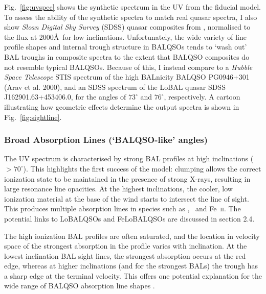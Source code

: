 \noindent
Fig.~\ref{fig:uvspec} shows the synthetic spectrum in the UV from the fiducial model. 
To assess the ability of the synthetic spectra to match real 
quasar spectra, I also show {\sl Sloan Digital Sky Survey} (SDSS) quasar
composites from \cite{reichard2003}, normalised to the flux at 2000\AA\
for low inclinations. Unfortunately, the wide variety of
line profile shapes and internal trough structure in BALQSOs
tends to `wash out' BAL troughs in composite spectra
to the extent that BALQSO composites do not resemble typical BALQSOs.
Because of this, I instead compare to a {\sl Hubble Space Telescope} 
STIS spectrum of the high BALnicity BALQSO PG0946+301 (Arav et al. 2000),
and an SDSS spectrum of the LoBAL quasar SDSS J162901.63+453406.0,
for the angles of $73^\circ$ and $76^\circ$, respectively. 
A cartoon illustrating how geometric effects determine
the output spectra is shown in Fig.~\ref{fig:sightline}.  

\subsubsection{Broad Absorption Lines (`BALQSO-like' angles)}
\label{sec:balqso_angles}

The UV spectrum is characterised by strong BAL 
profiles at high inclinations ($> 70^\circ$). 
This highlights the first success of the model: 
clumping allows the correct ionization state 
to be maintained in the presence of strong X-rays, 
resulting in large resonance line opacities. 
At the highest inclinations, the 
cooler, low ionization material at the base of the wind
starts to intersect the line of sight. This produces 
multiple absorption lines in species such as \mg,
\al\ and Fe~\textsc{ii}. The potential links to LoBALQSOs and 
FeLoBALQSOs are discussed in section 2.4.

The high ionization BAL profiles are often saturated, and the location in velocity space
of the strongest absorption in the profile varies with inclination.
At the lowest inclination BAL sight lines, the strongest absorption occurs at the red edge,
whereas at higher inclinations (and for the strongest BALs)
the trough has a sharp edge at the terminal velocity.
This offers one potential explanation for the wide range of BALQSO absorption
line shapes \citep[see e.g.][]{trump2006,knigge2008,filizak2014}.

